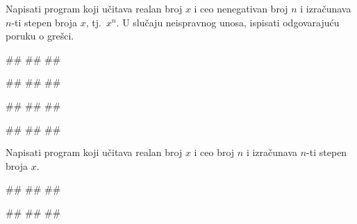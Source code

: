 \begin{Exercise}[label=PET_06] 
Napisati program koji učitava realan broj $x$ i ceo nenegativan broj
$n$ i izračunava $n$-ti stepen broja $x$, tj.~$x^n$.
U slučaju neispravnog unosa, ispisati odgovarajuću poruku o grešci.
 

\begin{miditest}
\begin{upotreba}{1}
#\naslovInt#
##
##
\end{upotreba}
\end{miditest}
\begin{miditest}
\begin{upotreba}{2}
#\naslovInt#
##
##
\end{upotreba}
\end{miditest}

\begin{miditest}
\begin{upotreba}{3}
#\naslovInt#
##
##
\end{upotreba}
\end{miditest}
\begin{miditest}
\begin{upotreba}{4}
#\naslovInt#
##
##
\end{upotreba}
\end{miditest}

\end{Exercise}
\ifresenja
\begin{Answer}[ref=PET_06]
\end{Answer}
\fi

\begin{Exercise}[label=PET_07]
Napisati program koji učitava realan broj $x$ i ceo broj
$n$ i izračunava $n$-ti stepen broja $x$. 
 

\begin{miditest}
\begin{upotreba}{1}
#\naslovInt#
##
##
\end{upotreba}
\end{miditest}
\begin{miditest}
\begin{upotreba}{2}
#\naslovInt#
##
##
\end{upotreba}
\end{miditest}
\end{Exercise}
\ifresenja
\begin{Answer}[ref=PET_07]
\end{Answer}
\fi



